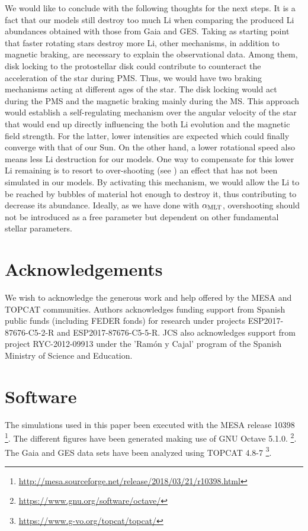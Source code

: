 \documentclass[fleqn,usenatbib]{mnras}
\begin{document}
We would like to conclude with the following thoughts for the next steps. It is a fact that our models still destroy too much Li when comparing the produced Li abundances obtained with those from Gaia and GES. Taking as starting point that faster rotating stars destroy more Li, other mechanisms, in addition to magnetic braking, are necessary to explain the observational data. Among them, disk locking to the protostellar disk could contribute to counteract the acceleration of the star during PMS. Thus, we would have two braking mechanisms acting at different ages of the star. The disk locking would act during the PMS and the magnetic braking mainly during the MS. This approach would establish a self-regulating mechanism over the angular velocity of the star that would end up directly influencing the both Li evolution and the magnetic field strength. For the latter, lower intensities are expected which could finally converge with that of our Sun. On the other hand, a lower rotational speed also means less Li destruction for our models. One way to compensate for this lower Li remaining is to resort to over-shooting (see \cite{Navarro2020}) an effect that has not been simulated in our models. By activating this mechanism, we would allow the Li to be reached by bubbles of material hot enough to destroy it, thus contributing to decrease its abundance. Ideally, as we have done with $\alpha_{\mathrm{MLT}}$, overshooting should not be introduced as a free parameter but dependent on other fundamental stellar parameters.\par


\section*{Acknowledgements}
We wish to acknowledge the generous work and help offered by the MESA and TOPCAT communities. Authors acknowledges funding support from Spanish public funds (including FEDER fonds) for research under projects ESP2017-87676-C5-2-R and ESP2017-87676-C5-5-R. JCS also acknowledges support from project RYC-2012-09913 under the 'Ram\'on y Cajal' program of the Spanish Ministry of Science and Education.

\section*{Software}
The simulations used in this paper been executed with the MESA release 10398 \footnote{\url{http://mesa.sourceforge.net/release/2018/03/21/r10398.html}}. The different figures have been generated making use of GNU Octave 5.1.0. \footnote{\url{https://www.gnu.org/software/octave/}}. The Gaia and GES data sets have been analyzed using TOPCAT 4.8-7 \footnote{\url{https://www.g-vo.org/topcat/topcat/}}. 
\end{document}
